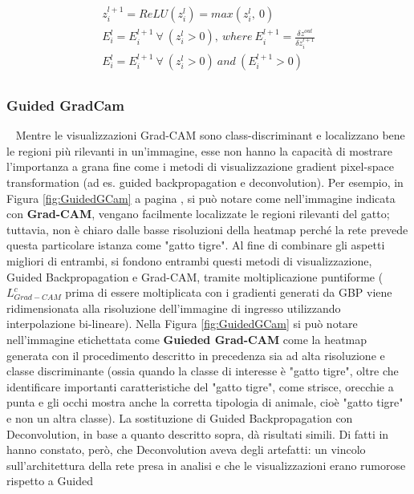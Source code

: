 \begin{gather*} 
z_{i}^{l+1}=ReLU(z_{i}^{l})=max(z_{i}^{l},\ 0)\tag{3} \label{eq:3} \\ 
E_{i}^{l}=E_{i}^{l+1}\ \forall\ (z_{i}^{l} > 0),\ where\ E_{i}^{l+1}= \frac{\delta z^{out}}{\delta z_{i}^{l+1}}\tag{4} \label{eq:4}\\ E_{i}^{l}=E_{i}^{l+1}\ \forall\ (z_{i}^{l} > 0)\ and\ (E_{i}^{l+1} > 0)\tag{5} \label{eq:5}\\
\end{gather*}

\subsubsection{Guided GradCam}~\newline
Mentre le visualizzazioni Grad-CAM sono class-discriminant e localizzano bene le regioni più rilevanti in un'immagine,
esse non hanno la capacità di mostrare l'importanza a grana fine come i metodi di visualizzazione gradient pixel-space
transformation (ad es. guided backpropagation e deconvolution).
Per esempio, in Figura \ref{fig:GuidedGCam} a pagina \pageref{fig:GuidedGCam}, si può notare come nell'immagine 
indicata con \textbf{Grad-CAM}, vengano facilmente localizzate le regioni rilevanti del gatto; tuttavia, non è chiaro
dalle basse risoluzioni della heatmap perché la rete prevede questa particolare istanza come "gatto tigre".
Al fine di combinare gli aspetti migliori di entrambi, si fondono entrambi questi metodi di visualizzazione, Guided
Backpropagation e Grad-CAM, tramite moltiplicazione puntiforme ($L_{Grad-CAM}^{c}$ prima di essere moltiplicata 
con i gradienti generati da GBP viene ridimensionata alla risoluzione dell'immagine di ingresso utilizzando
interpolazione bi-lineare). Nella Figura \ref{fig:GuidedGCam} si può notare nell'immagine etichettata come
\textbf{Guieded Grad-CAM} come la heatmap generata con il procedimento descritto in precedenza sia ad alta risoluzione
e classe discriminante (ossia quando la classe di interesse è "gatto tigre", oltre che identificare importanti
caratteristiche del "gatto tigre", come strisce, orecchie a punta e gli occhi mostra anche la corretta tipologia 
di animale, cioè "gatto tigre" e non un altra classe). 
La sostituzione di Guided Backpropagation con Deconvolution, in base a quanto descritto sopra, dà risultati simili. 
Di fatti in \cite{lyu2018deep} hanno constato, però, che Deconvolution aveva degli artefatti: un vincolo
sull'architettura della rete presa in analisi e che le visualizzazioni erano rumorose rispetto a Guided
